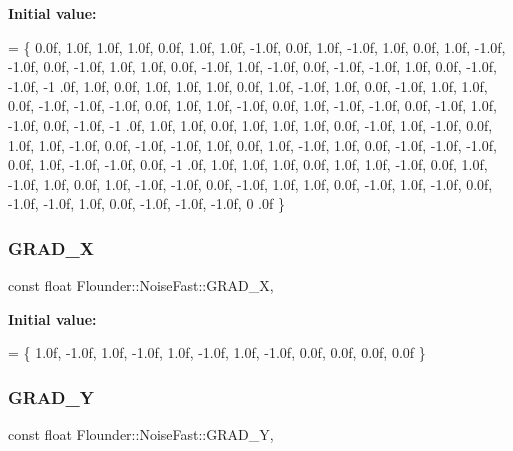 {\bfseries Initial value\+:}
\begin{DoxyCode}
=
    \{
        0.0f, 1.0f, 1.0f, 1.0f, 0.0f, 1.0f, 1.0f, -1.0f, 0.0f, 1.0f, -1.0f, 1.0f, 0.0f, 1.0f, -1.0f, -1.0f,
        0.0f, -1.0f, 1.0f, 1.0f, 0.0f, -1.0f, 1.0f, -1.0f, 0.0f, -1.0f, -1.0f, 1.0f, 0.0f, -1.0f, -1.0f, -1
      .0f,
        1.0f, 0.0f, 1.0f, 1.0f, 1.0f, 0.0f, 1.0f, -1.0f, 1.0f, 0.0f, -1.0f, 1.0f, 1.0f, 0.0f, -1.0f, -1.0f,
        -1.0f, 0.0f, 1.0f, 1.0f, -1.0f, 0.0f, 1.0f, -1.0f, -1.0f, 0.0f, -1.0f, 1.0f, -1.0f, 0.0f, -1.0f, -1
      .0f,
        1.0f, 1.0f, 0.0f, 1.0f, 1.0f, 1.0f, 0.0f, -1.0f, 1.0f, -1.0f, 0.0f, 1.0f, 1.0f, -1.0f, 0.0f, -1.0f,
        -1.0f, 1.0f, 0.0f, 1.0f, -1.0f, 1.0f, 0.0f, -1.0f, -1.0f, -1.0f, 0.0f, 1.0f, -1.0f, -1.0f, 0.0f, -1
      .0f,
        1.0f, 1.0f, 1.0f, 0.0f, 1.0f, 1.0f, -1.0f, 0.0f, 1.0f, -1.0f, 1.0f, 0.0f, 1.0f, -1.0f, -1.0f, 0.0f,
        -1.0f, 1.0f, 1.0f, 0.0f, -1.0f, 1.0f, -1.0f, 0.0f, -1.0f, -1.0f, 1.0f, 0.0f, -1.0f, -1.0f, -1.0f, 0
      .0f
    \}
\end{DoxyCode}
\mbox{\label{class_flounder_1_1_noise_fast_af2e77001e086f9dc078630ea62e703f1}} 
\subsubsection{\texorpdfstring{G\+R\+A\+D\+\_\+X}{GRAD\_X}}
{\footnotesize\ttfamily const float Flounder\+::\+Noise\+Fast\+::\+G\+R\+A\+D\+\_\+X\hspace{0.3cm}{\ttfamily [static]}, {\ttfamily [private]}}

{\bfseries Initial value\+:}
\begin{DoxyCode}
=
    \{
        1.0f, -1.0f, 1.0f, -1.0f,
        1.0f, -1.0f, 1.0f, -1.0f,
        0.0f, 0.0f, 0.0f, 0.0f
    \}
\end{DoxyCode}
\mbox{\label{class_flounder_1_1_noise_fast_aa4f79e19ccfc642ccf85957ca9f63f60}} 
\subsubsection{\texorpdfstring{G\+R\+A\+D\+\_\+Y}{GRAD\_Y}}
{\footnotesize\ttfamily const float Flounder\+::\+Noise\+Fast\+::\+G\+R\+A\+D\+\_\+Y\hspace{0.3cm}{\ttfamily [static]}, {\ttfamily [private]}}

